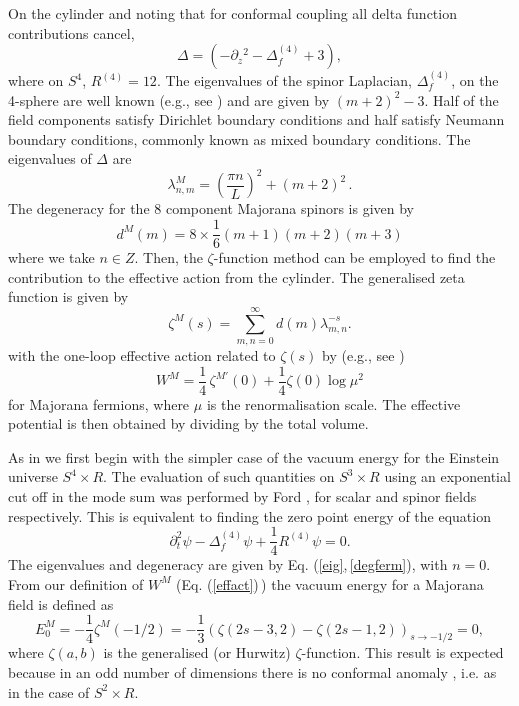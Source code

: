 \documentclass[a4paper,a4paper]{article}
\begin{document}
On the cylinder and noting that for conformal coupling all delta function contributions 
cancel,
\begin{equation}
\Delta=\left (-\partial_ z{}^2-\Delta^{(4)}_f+3\right),
\label{eigferm}
\end{equation}
where on $S^4$, $R^{(4)}=12$.
The eigenvalues of the spinor Laplacian, $\Delta^{(4)}_f$, on the 4-sphere 
are well known (e.g., see \cite{MOSS}) and are given by $(m+2)^2-3$. 
Half of the field components satisfy Dirichlet boundary conditions and half 
satisfy Neumann boundary conditions, commonly known as 
mixed boundary conditions. The eigenvalues of $\Delta$ are
\begin{equation}
\label{eig}
{\lambda_{n,m}^M}=\left(\frac{\pi n}{L}\right)^2+(m+2)^2\,.
\end{equation}
The degeneracy for the 8 component Majorana spinors is given by
\cite{MOSS}
\begin{equation}
d^M(m)=8\times\frac{1}{6}(m+1)(m+2)(m+3)
\label{degferm}
\end{equation}
where we take $n\in Z$. Then, the $\zeta$-function method can be employed 
to find the contribution to the effective action from the cylinder. 
The generalised zeta function is given by
\begin{equation}
\label{gfunc}
\zeta^M(s)=\sum_{m,n=0}^\infty d(m) \lambda_{m,n}^{-s}.
\end{equation}
with the one-loop effective action related to $\zeta(s)$ by (e.g., see 
\cite{MOSS, BD})
\begin{equation}
\label{effact}
W^M=\frac{1}{4}\,\zeta^{M\prime}(0)+\frac{1}{4} \zeta(0) \log \mu^2
\end{equation}
for Majorana fermions, where $\mu$ is the renormalisation scale. The 
effective potential is then obtained by dividing by the total volume.

As in \cite{NS} we first begin with the simpler case of the vacuum energy for the
Einstein universe $S^4\times R$. The evaluation of such quantities on 
$S^3\times R$  using an exponential cut off in the mode sum was performed by 
Ford \cite{FORD,FORD2}, for scalar and spinor fields respectively.
This is equivalent to finding the zero point energy of the equation
\begin{equation}
\partial_t^2\psi-\Delta_f^{(4)}\psi+\frac{1}{4}R^{(4)}\psi=0.
\end{equation}
The eigenvalues and degeneracy are given by Eq. (\ref{eig},\,\ref{degferm}), with 
$n=0$. From our definition of $W^M$ (Eq. (\ref{effact})\,) the vacuum energy for a 
Majorana field is defined as
\begin{equation}
E_0^M=-\frac 1 4 \zeta^M(-1/2)=
-\frac{1}{3}\left(\zeta(2s-3,2)-\zeta(2s-1,2)\right)_{s\rightarrow -1/2}=0,
\label{ein}
\end{equation}
where $\zeta(a,b)$ is the generalised (or Hurwitz) $\zeta$-function. 
This result is expected because in an odd number of dimensions there is no 
conformal anomaly \cite{BD}, i.e. as in the case of $S^2\times R$.
\end{document}
